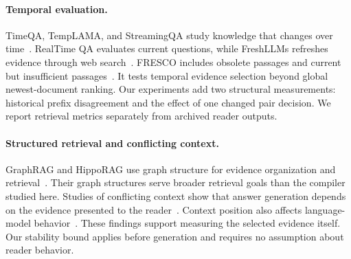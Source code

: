 \paragraph{Temporal evaluation.}
TimeQA, TempLAMA, and StreamingQA study knowledge that changes over time~\citep{chen2021timeqa,dhingra2022templama,liska2022streamingqa}.
RealTime QA evaluates current questions, while FreshLLMs refreshes evidence through web search~\citep{kasai2023realtimeqa,vu2024freshllms}.
FRESCO includes obsolete passages and current but insufficient passages~\citep{an2026fresco}.
It tests temporal evidence selection beyond global newest-document ranking.
Our experiments add two structural measurements: historical prefix disagreement and the effect of one changed pair decision.
We report retrieval metrics separately from archived reader outputs.

\paragraph{Structured retrieval and conflicting context.}
GraphRAG and HippoRAG use graph structure for evidence organization and retrieval~\citep{edge2024graphrag,gutierrez2024hipporag}.
Their graph structures serve broader retrieval goals than the compiler studied here.
Studies of conflicting context show that answer generation depends on the evidence presented to the reader~\citep{longpre2021conflicts,xie2024conflict}.
Context position also affects language-model behavior~\citep{liu2023lostmiddle}.
These findings support measuring the selected evidence itself.
Our stability bound applies before generation and requires no assumption about reader behavior.

